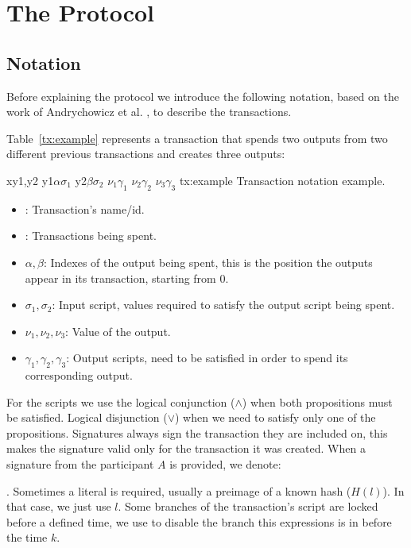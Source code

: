 \section{The Protocol}
\subsection{Notation}
Before explaining the protocol we introduce the following notation, based
  on the work of Andrychowicz et al. \cite{andrychowicz2014secure}, to describe
  the transactions.

Table~\ref{tx:example} represents a transaction that spends two outputs from
  two different previous transactions and creates three outputs:

  \transaction
    {x}{y1,y2}
      {y1}{$\alpha$}{$\sigma_1$}
      {y2}{$\beta$}{$\sigma_2$}
      \stopinputs
      {$\nu_1$}{$\gamma_1$}
      {$\nu_2$}{$\gamma_2$}
      {$\nu_3$}{$\gamma_3$}
      \stopoutputs
      {tx:example}
      {Transaction notation example.}

\begin{itemize}
    \item {}: Transaction's name/id.
    \item {}: Transactions being spent.
    \item $\alpha,\beta$: Indexes of the output being spent, this is the
                            position the outputs appear in its transaction,
                            starting from 0.
    \item $\sigma_1,\sigma_2$: Input script, values required to satisfy the
                                output script being spent.
    \item $\nu_1,\nu_2,\nu_3$: Value of the output.
    \item $\gamma_1, \gamma_2, \gamma_3$: Output scripts, need to be satisfied
                                          in order to spend its corresponding
                                          output.
\end{itemize}

For the scripts we use the logical conjunction ($\wedge$) when both propositions
  must be satisfied.
Logical disjunction ($\vee$) when we need to satisfy only one of the
  propositions.
Signatures always sign the transaction they are included on, this makes the
  signature valid only for the transaction it was created.
When a signature from the participant $A$ is provided, we denote: \signature{A}.
Sometimes a literal is required, usually a preimage of a known hash ($H(l)$).
In that case, we just use $l$.
Some branches of the transaction's script are locked before a defined time, we
  use  to disable the branch this expressions is in before the
  time $k$.

